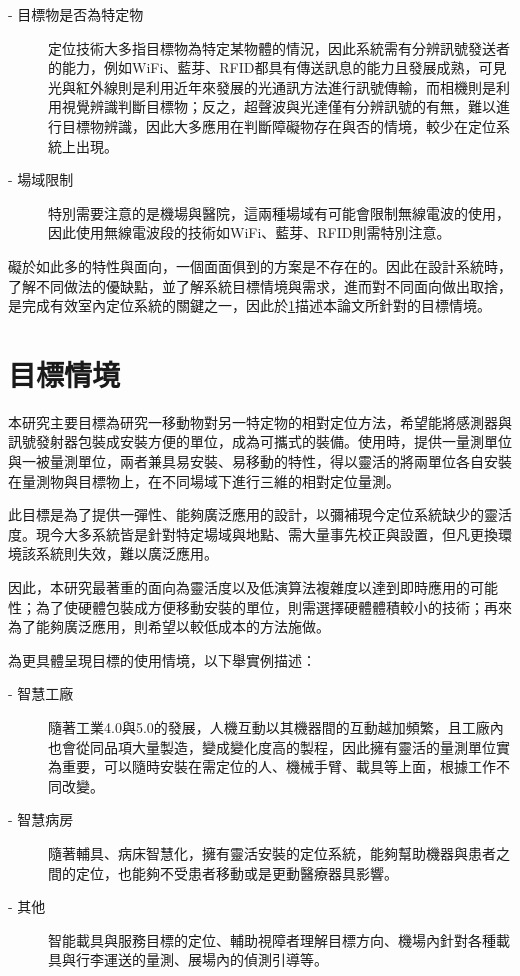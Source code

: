 \begin{description}
    \item[- 目標物是否為特定物] \hfill 
    
    定位技術大多指目標物為特定某物體的情況，因此系統需有分辨訊號發送者的能力，例如WiFi、藍芽、RFID都具有傳送訊息的能力且發展成熟，可見光與紅外線則是利用近年來發展的光通訊方法進行訊號傳輸，而相機則是利用視覺辨識判斷目標物；反之，超聲波與光達僅有分辨訊號的有無，難以進行目標物辨識，因此大多應用在判斷障礙物存在與否的情境，較少在定位系統上出現。
    
    \item[- 場域限制]\hfill 
    
    特別需要注意的是機場與醫院，這兩種場域有可能會限制無線電波的使用，因此使用無線電波段的技術如WiFi、藍芽、RFID則需特別注意。
\end{description}

礙於如此多的特性與面向，一個面面俱到的方案是不存在的。因此在設計系統時，了解不同做法的優缺點，並了解系統目標情境與需求，進而對不同面向做出取捨，是完成有效室內定位系統的關鍵之一\cite{survey_indoor2018}，因此於\ref{chp:motivate}描述本論文所針對的目標情境。







\section{目標情境}
\label{chp:motivate}
本研究主要目標為研究一移動物對另一特定物的相對定位方法，希望能將感測器與訊號發射器包裝成安裝方便的單位，成為可攜式的裝備。使用時，提供一量測單位與一被量測單位，兩者兼具易安裝、易移動的特性，得以靈活的將兩單位各自安裝在量測物與目標物上，在不同場域下進行三維的相對定位量測。

此目標是為了提供一彈性、能夠廣泛應用的設計，以彌補現今定位系統缺少的靈活度。現今大多系統皆是針對特定場域與地點、需大量事先校正與設置，但凡更換環境該系統則失效，難以廣泛應用。

因此，本研究最著重的面向為靈活度以及低演算法複雜度以達到即時應用的可能性；為了使硬體包裝成方便移動安裝的單位，則需選擇硬體體積較小的技術；再來為了能夠廣泛應用，則希望以較低成本的方法施做。

為更具體呈現目標的使用情境，以下舉實例描述：
\begin{description}
    \item[- 智慧工廠] \hfill 
    
    \quad \quad 
    隨著工業4.0與5.0的發展，人機互動以其機器間的互動越加頻繁，且工廠內也會從同品項大量製造，變成變化度高的製程，因此擁有靈活的量測單位實為重要，可以隨時安裝在需定位的人、機械手臂、載具等上面，根據工作不同改變。

    \item[- 智慧病房] \hfill 
    
    \qquad
    隨著輔具、病床智慧化，擁有靈活安裝的定位系統，能夠幫助機器與患者之間的定位，也能夠不受患者移動或是更動醫療器具影響。
    
    \item[- 其他]  \hfill 
    
    \qquad
    智能載具與服務目標的定位、輔助視障者理解目標方向、機場內針對各種載具與行李運送的量測、展場內的偵測引導等。
\end{description}

